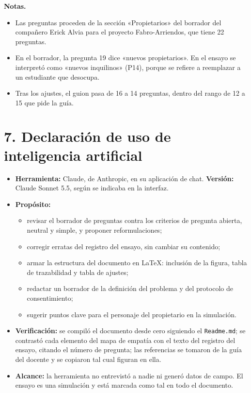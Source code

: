 \documentclass[11pt,a4paper]{article}
\begin{document}
\textbf{Notas.}
\begin{itemize}
\item Las preguntas proceden de la sección «Propietarios» del borrador del compañero Erick Alvia para el proyecto Fabro-Arriendos, que tiene 22 preguntas.
\item En el borrador, la pregunta 19 dice «nuevos propietarios». En el ensayo se interpretó como «nuevos inquilinos» (P14), porque se refiere a reemplazar a un estudiante que desocupa.
\item Tras los ajustes, el guion pasa de 16 a 14 preguntas, dentro del rango de 12 a 15 que pide la guía.
\end{itemize}


\section*{7. Declaración de uso de inteligencia artificial}

\begin{itemize}
\item \textbf{Herramienta:} Claude, de Anthropic, en su aplicación de chat. \textbf{Versión:} Claude Sonnet 5.5, según se indicaba en la interfaz.
\item \textbf{Propósito:}
  \begin{itemize}
  \item revisar el borrador de preguntas contra los criterios de pregunta abierta, neutral y simple, y proponer reformulaciones;
  \item corregir erratas del registro del ensayo, sin cambiar su contenido;
  \item armar la estructura del documento en LaTeX: inclusión de la figura, tabla de trazabilidad y tabla de ajustes;
  \item redactar un borrador de la definición del problema y del protocolo de consentimiento;
  \item sugerir puntos clave para el personaje del propietario en la simulación.
  \end{itemize}
\item \textbf{Verificación:} se compiló el documento desde cero siguiendo el \texttt{Readme.md}; se contrastó cada elemento del mapa de empatía con el texto del registro del ensayo, citando el número de pregunta; las referencias se tomaron de la guía del docente y se copiaron tal cual figuran en ella.
\item \textbf{Alcance:} la herramienta no entrevistó a nadie ni generó datos de campo. El ensayo es una simulación y está marcada como tal en todo el documento.
\end{itemize}



\end{document}
